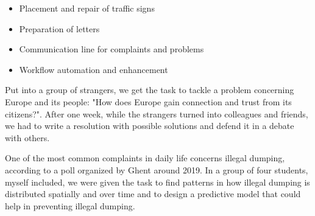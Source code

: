\documentclass[10pt,a4paper,ragged2e,withhyper]{altacv}
\begin{document}
\begin{paracol}{2}

\begin{itemize}
\item Placement and repair of traffic signs
\end{itemize}

\divider

\begin{itemize}
\item Preparation of letters
\item Communication line for complaints and problems
\end{itemize}

\divider

\begin{itemize}
\item Workflow automation and enhancement
\end{itemize}

\divider

Put into a group of strangers, we get the task to tackle a problem concerning Europe and its people: "How does Europe gain connection and trust from its citizens?".
After one week, while the strangers turned into colleagues and friends, we had to write a resolution with possible solutions and defend it in a debate with others.

\divider

One of the most common complaints in daily life concerns illegal dumping, according to a poll organized by Ghent around 2019. 
In a group of four students, myself included, we were given the task to find patterns in how illegal dumping is distributed spatially and over time and to design
a predictive model that could help in preventing illegal dumping.

\medskip



\end{paracol}
\end{document}
